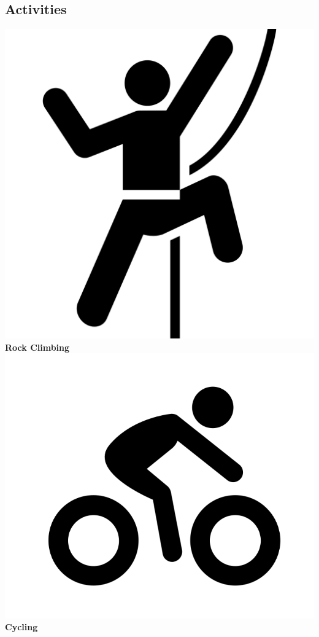 \documentclass[]{friggeri-cv}
\begin{document}
\begin{aside}
  \section{Activities}
    \includegraphics[scale=0.03]{img/climbing.png} 
    \textbf{Rock Climbing}
        \includegraphics[scale=0.05]{img/cycling.png} 
    \textbf{Cycling}

\end{aside}
\end{document}
